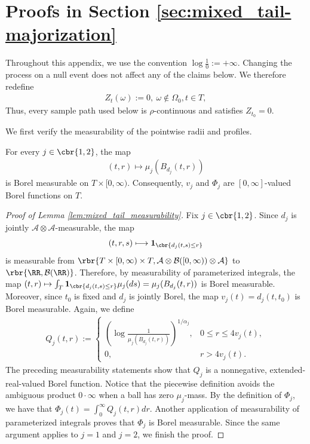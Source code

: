 \documentclass[11pt]{article}
\begin{document}
\section{Proofs in Section \ref{sec:mixed_tail-majorization}}\label{app:proofs_mixed_tail}

Throughout this appendix, we use the convention $\log\frac{1}{0}:=+\infty$. Changing the process on a null event does not affect any of the claims
below. We therefore redefine
\begin{align*}
Z_t(\omega):=0,\ \omega \notin\Omega_0,t\in T,
\end{align*}
Thus, every sample path used below is
$\rho$-continuous and satisfies $Z_{t_0}=0$.

We first verify the measurability of the pointwise radii and profiles.

\begin{lemma}
\label{lem:mixed_tail_measurability}
For every $j\in\cbr{1,2}$, the map
\begin{align*}
(t,r)\longmapsto\mu_j(B_{d_j}(t,r))
\end{align*}
is Borel measurable on $T\times[0,\infty)$. Consequently,
$v_j$ and $\Phi_j$ are $[0,\infty]$-valued Borel functions on $T$.
\end{lemma}

\begin{proof}[Proof of Lemma \ref{lem:mixed_tail_measurability}]
Fix $j\in\cbr{1,2}$. Since $d_j$ is jointly
$\mathcal A\otimes\mathcal A$-measurable, the map
\begin{align*}
(t,r,s)
\longmapsto
\mathbf 1_{\cbr{d_j(t,s)\le r}}
\end{align*}
is measurable from $\rbr{
T\times[0,\infty)\times T,
\mathcal A\otimes\mathcal B([0,\infty))\otimes\mathcal A
}$ to $\rbr{\RR,\mathcal B(\RR)}$. Therefore, by measurability of
parameterized integrals, the map $(t,r)
\mapsto
\int_T
\mathbf 1_{\cbr{d_j(t,s)\le r}}\mu_j(ds)=
\mu_j(B_{d_j}(t,r))$ is Borel measurable.
Moreover, since $t_0$ is fixed and $d_j$ is jointly Borel, the map $v_j(t)=d_j(t,t_0)$ is Borel measurable. Again, we define
\begin{align*}
Q_j(t,r)
:=
\begin{cases}
\displaystyle
\left(
\log\frac{1}{\mu_j(B_{d_j}(t,r))}
\right)^{1/\alpha_j},
&0\le r\le4v_j(t),\\[1.2ex]
0,
&r>4v_j(t).
\end{cases}
\end{align*}
The preceding measurability statements show that $Q_j$ is a
nonnegative, extended-real-valued Borel function. Notice that the
piecewise definition avoids the ambiguous product $0\cdot\infty$ when a
ball has zero $\mu_j$-mass. By the definition of $\Phi_j$, we have that $\Phi_j(t)
=
\int_0^\infty Q_j(t,r)dr$.
Another application of measurability of parameterized integrals proves
that $\Phi_j$ is Borel measurable. Since the same argument applies to
$j=1$ and $j=2$, we finish the proof.
\end{proof}
\end{document}
